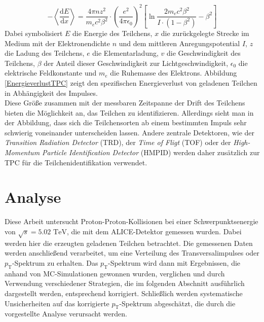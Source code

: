 \documentclass[12pt,a4paper]{report}
\begin{document}
\begin{equation}
- \left<\frac{\mathrm{d}E}{\mathrm{d}x}\right> = \frac{4 \pi n z^2}{m_e c^2 \beta^2} \cdot \left(\frac{e^2}{4 \pi \epsilon_0}\right)^2 \left[ \ln{\frac{2 m_e c^2 \beta^2}{I \cdot (1 - \beta^2)}} - \beta^2 \right] 
\end{equation}
Dabei symbolisiert $E$ die Energie des Teilchens, $x$ die zurückgelegte Strecke im Medium mit der Elektronendichte $n$ und dem mittleren Anregungspotential $I$, $z$ die Ladung des Teilchens, $e$ die Elementarladung, $v$ die Geschwindigkeit des Teilchens, $\beta$ der Anteil dieser Geschwindigkeit zur Lichtgeschwindigkeit, $\epsilon_0$ die elektrische Feldkonstante und $m_e$ die Ruhemasse des Elektrons. Abbildung \ref{EnergieverlustTPC} zeigt den spezifischen Energieverlust von geladenen Teilchen in Abhängigkeit des Impulses.\\
Diese Größe zusammen mit der messbaren Zeitspanne der Drift des Teilchens bieten die Möglichkeit an, das Teilchen zu identifizieren. Allerdings sieht man in der Abbildung, dass sich die Teilchensorten ab einem bestimmten Impuls sehr schwierig voneinander unterscheiden lassen. Andere zentrale Detektoren, wie der \textit{Transition Radiation Detector} (TRD), der \textit{Time of Fligt} (TOF) oder der \textit{High-Momentum Particle Identification Detector} (HMPID) werden daher zusätzlich zur TPC für die Teilchenidentifikation verwendet.
 
\chapter{Analyse}
\label{cha:Analyse}
Diese Arbeit untersucht Proton-Proton-Kollisionen bei einer Schwerpunktsenergie von $\sqrt{s} = 5.02$ $\mathrm{TeV}$, die mit dem ALICE-Detektor gemessen wurden. Dabei werden hier die erzeugten geladenen Teilchen betrachtet. Die gemessenen Daten werden anschließend verarbeitet, um eine Verteilung des Transversalimpulses oder $p_{\mathrm{T}}$-Spektrum zu erhalten. Das $p_{\mathrm{T}}$-Spektrum wird dann mit Ergebnissen, die anhand von MC-Simulationen gewonnen wurden, verglichen und durch Verwendung verschiedener Strategien, die im folgenden Abschnitt ausführlich dargestellt werden, entsprechend korrigiert. Schließlich werden systematische Unsicherheiten auf das korrigierte $p_{\mathrm{T}}$-Spektrum abgeschätzt, die durch die vorgestellte Analyse verursacht werden.
\end{document}
